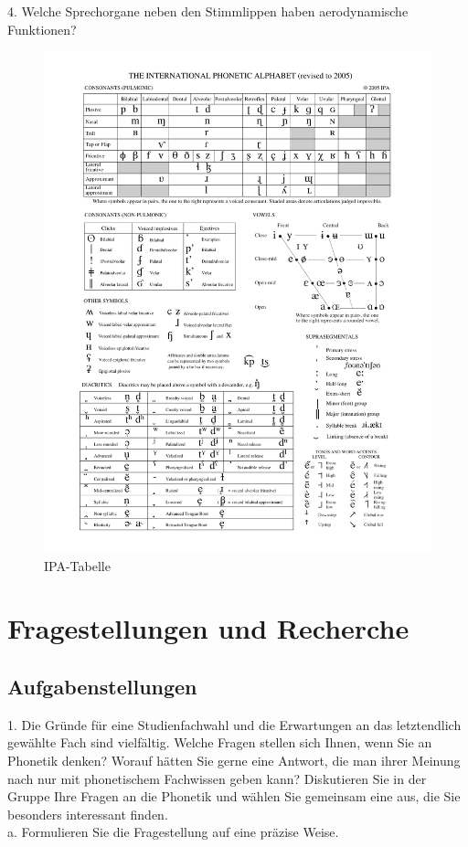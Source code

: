 \documentclass[11pt]{book}
\begin{document}
4.	Welche Sprechorgane neben den Stimmlippen haben aerodynamische Funktionen?
\begin{figure}[htbp]
\begin{center}
\includegraphics[width=\textwidth]{grafiken/sprechen/ipa}
\caption{IPA-Tabelle}
\label{fig4}
\end{center}
\end{figure}








\chapter{Fragestellungen und Recherche}


\section{Aufgabenstellungen}

1.	Die Gründe für eine Studienfachwahl und die Erwartungen an das letztendlich gewählte Fach sind vielfältig.  Welche Fragen stellen sich Ihnen, wenn Sie an Phonetik denken? Worauf hätten Sie gerne eine Antwort, die man ihrer Meinung nach nur mit phonetischem Fachwissen geben kann? Diskutieren Sie in der Gruppe Ihre Fragen an die Phonetik und wählen Sie gemeinsam eine aus, die Sie besonders interessant finden.\\
\newpage
a.	Formulieren Sie die Fragestellung auf eine präzise Weise.
\end{document}
